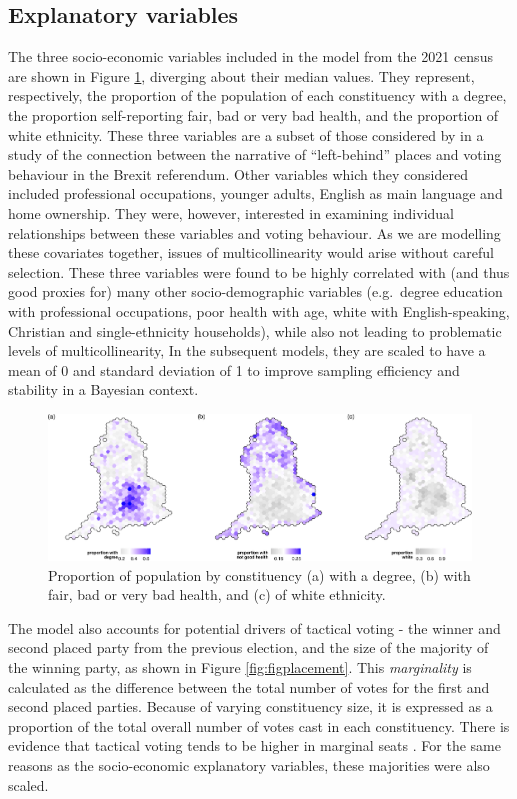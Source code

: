 \documentclass[webpdf,large,contemporary,namedate]{oup-authoring-template}
\theoremstyle{thmstyleone}
\theoremstyle{thmstyletwo}
\theoremstyle{thmstylethree}
\begin{document}
\subsection{Explanatory variables}\label{explanatory-variables}

The three socio-economic variables included in the model from the 2021
census are shown in Figure \ref{fig:figsocec}, diverging about their
median values. They represent, respectively, the proportion of the
population of each constituency with a degree, the proportion
self-reporting fair, bad or very bad health, and the proportion of white
ethnicity. These three variables are a subset of those considered by
\citet{beecham2018} in a study of the connection between the narrative
of ``left-behind'' places and voting behaviour in the Brexit referendum.
Other variables which they considered included professional occupations,
younger adults, English as main language and home ownership. They were,
however, interested in examining individual relationships between these
variables and voting behaviour. As we are modelling these covariates
together, issues of multicollinearity would arise without careful
selection. These three variables were found to be highly correlated with
(and thus good proxies for) many other socio-demographic variables
(e.g.~degree education with professional occupations, poor health with
age, white with English-speaking, Christian and single-ethnicity
households), while also not leading to problematic levels of
multicollinearity, In the subsequent models, they are scaled to have a
mean of 0 and standard deviation of 1 to improve sampling efficiency and
stability in a Bayesian context.

\begin{figure}[th]
\includegraphics[width=1\linewidth]{jrss_resubmission_files/figure-latex/figsocec-1} \caption{Proportion of population by constituency (a) with a degree, (b) with fair, bad or very bad health, and (c) of white ethnicity.}\label{fig:figsocec}
\end{figure}

The model also accounts for potential drivers of tactical voting - the
winner and second placed party from the previous election, and the size
of the majority of the winning party, as shown in Figure
\ref{fig:figplacement}. This \emph{marginality} is calculated as the
difference between the total number of votes for the first and second
placed parties. Because of varying constituency size, it is expressed as
a proportion of the total overall number of votes cast in each
constituency. There is evidence that tactical voting tends to be higher
in marginal seats \citep{Cain1978tact, Johnston1992tact}. For the same
reasons as the socio-economic explanatory variables, these majorities
were also scaled.
\end{document}
